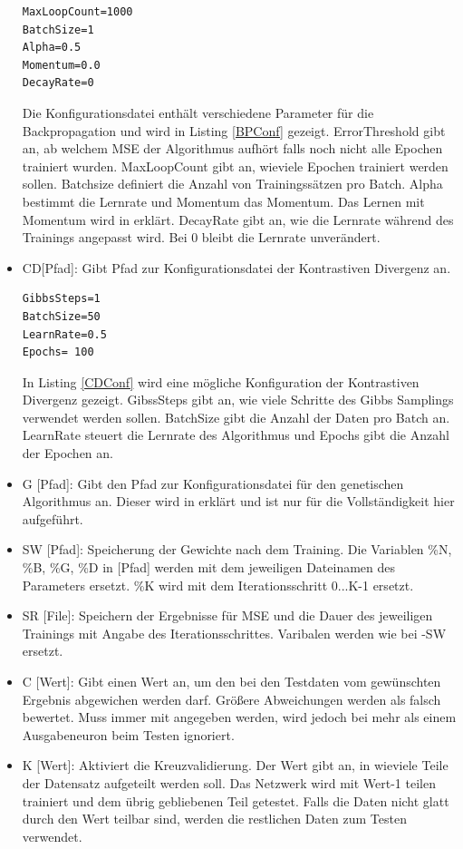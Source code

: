 \documentclass[12pt]{article}
\begin{document}
\begin{itemize}
\begin{lstlisting}[captionpos=b,caption={Beispielkonfiguration für den Backpropagation-Algorithmus},label={BPConf}]
MaxLoopCount=1000
BatchSize=1
Alpha=0.5
Momentum=0.0
DecayRate=0
\end{lstlisting}
Die Konfigurationsdatei enthält verschiedene Parameter für die Backpropagation und wird in Listing \ref{BPConf} gezeigt. ErrorThreshold gibt an, ab welchem MSE der Algorithmus aufhört falls noch nicht alle Epochen trainiert wurden. MaxLoopCount gibt an, wieviele Epochen trainiert werden sollen. Batchsize definiert die Anzahl von Trainingssätzen pro Batch. Alpha bestimmt die Lernrate und Momentum das Momentum. Das Lernen mit Momentum wird in \cite{Helm} erklärt. DecayRate gibt an, wie die Lernrate während des Trainings angepasst wird. Bei 0 bleibt die Lernrate unverändert.

\item CD[Pfad]: Gibt Pfad zur Konfigurationsdatei der Kontrastiven Divergenz an. 
\begin{lstlisting}[captionpos=b,caption={Beispielkonfiguration der Kontrastiven Divergenz},label={CDConf}]
GibbsSteps=1
BatchSize=50
LearnRate=0.5
Epochs= 100
\end{lstlisting}
In Listing \ref{CDConf} wird eine mögliche Konfiguration der Kontrastiven Divergenz gezeigt. GibssSteps gibt an, wie viele Schritte des Gibbs Samplings verwendet werden sollen. BatchSize gibt die Anzahl der Daten pro Batch an. LearnRate steuert die Lernrate des Algorithmus und Epochs gibt die Anzahl der Epochen an.

\item G [Pfad]: Gibt den Pfad zur Konfigurationsdatei für den genetischen Algorithmus an. Dieser wird in \cite{Helm} erklärt und ist nur für die Vollständigkeit hier aufgeführt.
\item SW [Pfad]:	Speicherung der Gewichte nach dem Training. Die
			Variablen \%N, \%B, \%G,  \%D in [Pfad] werden mit dem 
 			jeweiligen Dateinamen des Parameters ersetzt.
			\%K wird mit dem Iterationsschritt 0...K-1 ersetzt.
\item SR [File]:	Speichern der Ergebnisse für MSE und die Dauer des jeweiligen Trainings mit Angabe des Iterationsschrittes. Varibalen werden wie bei -SW ersetzt. 

\item C [Wert]: Gibt einen Wert an, um den bei den Testdaten vom gewünschten Ergebnis abgewichen werden darf. Größere Abweichungen werden als falsch bewertet. Muss immer mit angegeben werden, wird jedoch bei mehr als einem Ausgabeneuron beim Testen ignoriert.

\item K [Wert]: Aktiviert die Kreuzvalidierung. Der Wert gibt an, in wieviele Teile der Datensatz aufgeteilt werden soll. Das Netzwerk wird mit Wert-1 teilen trainiert und dem übrig gebliebenen Teil getestet. Falls die Daten nicht glatt durch den Wert teilbar sind, werden die restlichen Daten zum Testen verwendet. 


\end{itemize}
\end{document}
